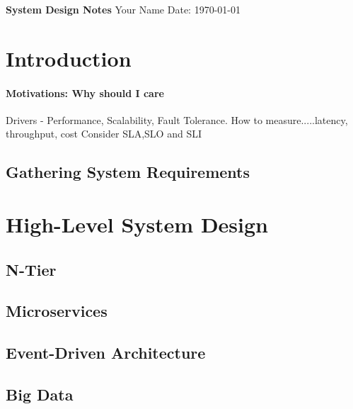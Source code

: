 \documentclass[a4paper, 11pt]{book}
\begin{document}
    \begin{titlepage}
        \centering
        \vspace*{2in}
        \Huge \textbf{System Design Notes}
        \vfill
        \Large Your Name
        \vfill
        \Large Date: \today
    \end{titlepage}

    \newpage

    \tableofcontents
    \newpage



    \section{Introduction}

    \paragraph{Motivations: Why should I care}
    Drivers - Performance, Scalability, Fault Tolerance.
    How to measure.....latency, throughput, cost
    Consider SLA,SLO and SLI

    \subsection{Gathering System Requirements}
    \lipsum[1] %




    \section{High-Level System Design}
    \lipsum[2]

    \subsection{N-Tier}

    \subsection{Microservices}

    \subsection{Event-Driven Architecture}

    \subsection{Big Data}
\end{document}
